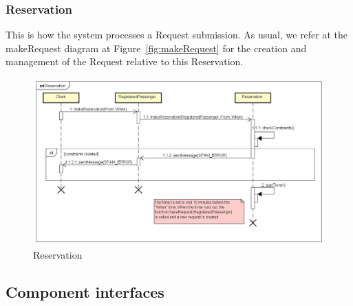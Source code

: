 		\subsubsection{Reservation}
		This is how the system processes a Request submission. As usual, we refer at the makeRequest
		diagram at Figure~\ref{fig:makeRequest} for the creation and management of the Request relative
		to this Reservation.
		\begin{figure}[h!]
			\begin{center}
				\includegraphics[width=1\linewidth]{../SE2_SD/Reservation}
				\caption{Reservation}
			\end{center}
		\end{figure}
		\clearpage
	\subsection{Component interfaces}
